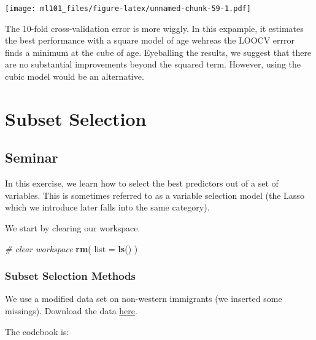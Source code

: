 \documentclass[]{article}
\newenvironment{Shaded}{\begin{snugshade}}{\end{snugshade}}
\newcommand{\CommentTok}[1]{\textcolor[rgb]{0.56,0.35,0.01}{\textit{#1}}}
\newcommand{\DataTypeTok}[1]{\textcolor[rgb]{0.13,0.29,0.53}{#1}}
\newcommand{\KeywordTok}[1]{\textcolor[rgb]{0.13,0.29,0.53}{\textbf{#1}}}
\newcommand{\NormalTok}[1]{#1}
\begin{document}
\texttt{[image: ml101\_files/figure-latex/unnamed-chunk-59-1.pdf]}

The 10-fold cross-validation error is more wiggly. In this expample, it estimates the best performance with a square model of age wehreas the LOOCV errror finds a minimum at the cube of age. Eyeballing the results, we suggest that there are no substantial improvements beyond the squared term. However, using the cubic model would be an alternative.

\hypertarget{subset-selection}{%
\section{Subset Selection}\label{subset-selection}}

\hypertarget{seminar-2}{%
\subsection{Seminar}\label{seminar-2}}

In this exercise, we learn how to select the best predictors out of a set of variables. This is sometimes referred to as a variable selection model (the Lasso which we introduce later falls into the same category).

We start by clearing our workspace.

\begin{Shaded}
\begin{Highlighting}[]
\CommentTok{# clear workspace}
\KeywordTok{rm}\NormalTok{( }\DataTypeTok{list =} \KeywordTok{ls}\NormalTok{() )}
\end{Highlighting}
\end{Shaded}

\hypertarget{subset-selection-methods}{%
\subsubsection{Subset Selection Methods}\label{subset-selection-methods}}

We use a modified data set on non-western immigrants (we inserted some missings). Download the data \href{http://philippbroniecki.github.io/ML2017.io/data/BSAS_manip_missings.RData}{here}.

The codebook is:
\end{document}
